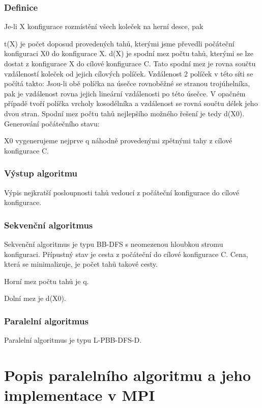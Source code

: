 \documentclass[12pt,a4paper]{article}
\begin{document}
\subsubsection{Definice}

Je-li X konfigurace rozmístění všech koleček na herní desce, pak

t(X) je počet doposud provedených tahů, kterými jsme převedli počáteční konfiguraci X0 do konfigurace X.
d(X) je spodní mez počtu tahů, kterými se lze dostat z konfigurace X do cílové konfigurace C. Tato spodní mez je rovna součtu vzdáleností koleček od jejich cílových políček. Vzdálenost 2 políček v této síti se počítá takto: Jsou-li obě políčka na úsečce rovnoběžné se stranou trojúhelníka, pak je vzdálenost rovna jejich lineární vzdálenosti po této úsečce. V opačném případě tvoří políčka vrcholy kosodélníka a vzdálenost se rovná součtu délek jeho dvou stran. Spodní mez počtu tahů nejlepšího možného řešení je tedy d(X0).
Generování počátečního stavu:

X0 vygenerujeme nejprve q náhodně provedenými zpětnými tahy z cílové konfigurace C.

\subsubsection{Výstup algoritmu}

Výpis nejkratší posloupnosti tahů vedoucí z počáteční konfigurace do cílové konfigurace.

\subsubsection{Sekvenční algoritmus}

Sekvenční algoritmus je typu BB-DFS s neomezenou hloubkou stromu konfiguraci. Přípustný stav je cesta z počáteční do cílové konfigurace C. Cena, která se minimalizuje, je počet tahů takové cesty.

Horní mez počtu tahů je q.

Dolní mez je d(X0).

\subsubsection{Paralelní algoritmus}

Paralelní algoritmus je typu L-PBB-DFS-D.



\section{Popis paralelního algoritmu a jeho implementace v MPI}
\end{document}
